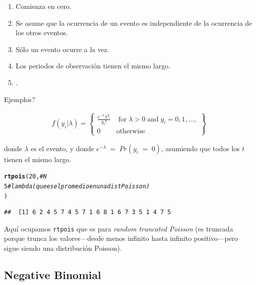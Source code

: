 \documentclass[onesided]{article}\usepackage[]{graphicx}\usepackage[]{color}
\makeatletter
\newcommand{\hlnum}[1]{\textcolor[rgb]{0.686,0.059,0.569}{#1}}%
\newcommand{\hlcom}[1]{\textcolor[rgb]{0.678,0.584,0.686}{\textit{#1}}}%
\newcommand{\hlstd}[1]{\textcolor[rgb]{0.345,0.345,0.345}{#1}}%
\newcommand{\hlkwd}[1]{\textcolor[rgb]{0.737,0.353,0.396}{\textbf{#1}}}%
\newenvironment{kframe}{%
 \def\at@end@of@kframe{}%
 \ifinner\ifhmode%
  \def\at@end@of@kframe{\end{minipage}}%
  \begin{minipage}{\columnwidth}%
 \fi\fi%
 \def\FrameCommand##1{\hskip\@totalleftmargin \hskip-\fboxsep
 \colorbox{shadecolor}{##1}\hskip-\fboxsep
     \hskip-\linewidth \hskip-\@totalleftmargin \hskip\columnwidth}%
 \MakeFramed {\advance\hsize-\width
   \@totalleftmargin\z@ \linewidth\hsize
   \@setminipage}}%
 {\par\unskip\endMakeFramed%
 \at@end@of@kframe}
\newenvironment{knitrout}{}{} %
\makeatother
\begin{document}
\begin{enumerate}
\item Comienza en cero.
\item Se asume que la ocurrencia de un evento es independiente de la ocurrencia de los otros eventos.
\item S\'olo un evento ocurre a la vez.
\item Los periodos de observaci\'on tienen el mismo largo. 
\item {\color{red}{\bf Promedio y varianza son iguales}}.
\end{enumerate}

{\color{red}Ejemplos?}


\begin{equation}\label{Poisson}
\begin{split}
f(y_{i}|\lambda) =	\begin{Bmatrix} \frac{\epsilon^{-\lambda}\lambda^{y_{i}}}{y_{i}!} & \;\text{for}\; \lambda > 0 \;\text{and}\;  y_{i}=0,1,\ldots, \\ 
0 & \text{otherwise} \end{Bmatrix}
\end{split}
\end{equation}

donde $\lambda$ es el evento, y donde $\epsilon^{-\lambda} \;=\; Pr(y_{i}\;=\;0)$, asumiendo que todos los $t$ tienen el mismo largo.

\begin{knitrout}
\color{fgcolor}\begin{kframe}
\begin{alltt}
\hlkwd{rtpois}\hlstd{(}\hlnum{20}\hlstd{,} \hlcom{# N}
       \hlnum{5} \hlcom{# lambda (que es el promedio en una dist Poisson)}
       \hlstd{)}
\end{alltt}
\begin{verbatim}
##  [1] 6 2 4 5 7 4 5 7 1 6 8 1 6 7 3 5 1 4 7 5
\end{verbatim}
\end{kframe}
\end{knitrout}

Aqu\'i ocupamos \texttt{rtpois} que es para \emph{random truncated Poisson} (es truncada porque trunca los valores---desde menos infinito hasta infinito positivo---pero sigue siendo una distribuci\'on Poisson).

\subsection{Negative Binomial}
\end{document}
